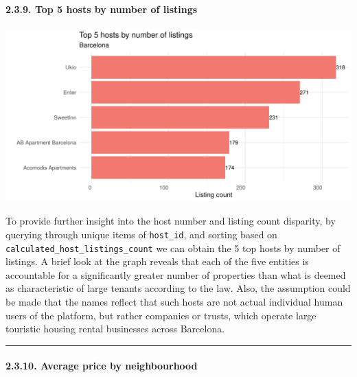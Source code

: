 \documentclass[
]{article}
\begin{document}
\hypertarget{top-5-hosts-by-number-of-listings}{%
\paragraph{2.3.9. Top 5 hosts by number of
listings}\label{top-5-hosts-by-number-of-listings}}

\begin{center}\includegraphics{Barcelona-AirBnB-Insights_files/figure-latex/plot9-1} \end{center}

To provide further insight into the host number and listing count
disparity, by querying through unique items of \texttt{host\_id}, and
sorting based on \texttt{calculated\_host\_listings\_count} we can
obtain the 5 top hosts by number of listings. A brief look at the graph
reveals that each of the five entities is accountable for a
significantly greater number of properties than what is deemed as
characteristic of large tenants according to the law. Also, the
assumption could be made that the names reflect that such hosts are not
actual individual human users of the platform, but rather companies or
trusts, which operate large touristic housing rental businesses across
Barcelona.

\begin{center}\rule{0.5\linewidth}{0.5pt}\end{center}

\hypertarget{average-price-by-neighbourhood}{%
\paragraph{2.3.10. Average price by
neighbourhood}\label{average-price-by-neighbourhood}}
\end{document}
